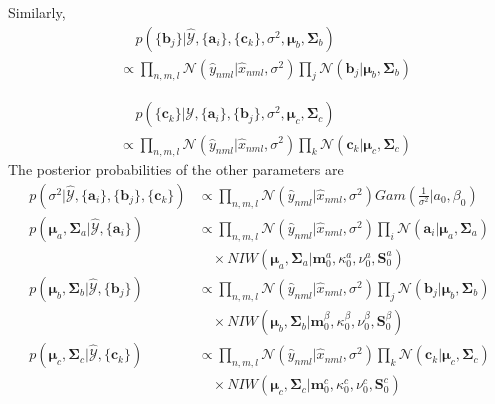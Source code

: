 \documentclass{article}
\newcommand{\bs}[1]{\boldsymbol{#1}}
\begin{document}
\begin{flushleft}
Similarly,
\begin{equation}
\begin{split}
	&\quad \, p(\{\bs{b}_j\}|\mathcal{\hat{Y}},\{\bs{a}_i\},\{\bs{c}_k\},\sigma^2,\bs{\mu}_b, \bs{\Sigma}_b)\\
	&\propto 
	\prod_{n,m,l}\mathcal{N}(\hat{y}_{nml}|\hat{x}_{nml},\sigma^2) 
		\prod_j \mathcal{N}(\bs{b}_j|\bs{\mu}_b,\bs{\Sigma}_b)
\end{split}
\end{equation}

\begin{equation}
\begin{split}
	&\quad \, p(\{\bs{c}_k\}|\mathcal{\hat{Y}},\{\bs{a}_i\},\{\bs{b}_j\},\sigma^2,\bs{\mu}_c, \bs{\Sigma}_c)\\
	&\propto 
	\prod_{n,m,l}\mathcal{N}(\hat{y}_{nml}|\hat{x}_{nml},\sigma^2) 
		\prod_k \mathcal{N}(\bs{c}_k|\bs{\mu}_c,\bs{\Sigma}_c)
\end{split}
\end{equation}
The posterior probabilities of the other parameters are
\begin{align}
	p(\sigma^2|\mathcal{\hat{Y}}, \{\bs{a}_i\}, \{\bs{b}_j\}, \{\bs{c}_k\}) 
	&\propto \prod_{n,m,l}\mathcal{N}(\hat{y}_{nml}|\hat{x}_{nml},\sigma^2)Gam(\frac{1}{\sigma^2}|a_0,\beta_0)\\
	p(\bs{\mu}_a, \bs{\Sigma}_a|\mathcal{\hat{Y}}, \{\bs{a}_i\}) 
	&\propto \prod_{n,m,l}\mathcal{N}(\hat{y}_{nml}|\hat{x}_{nml},\sigma^2) \prod_i \mathcal{N}(\bs{a}_i|\bs{\mu}_a,\bs{\Sigma}_a)\\
	& \quad \times NIW(\bs{\mu}_a, \bs{\Sigma}_a|\bs{m}^a_0,\kappa^a_0,\nu^a_0,\bs{S}^a_0)\\
	p(\bs{\mu}_b, \bs{\Sigma}_b|\mathcal{\hat{Y}}, \{\bs{b}_j\}) 
	&\propto \prod_{n,m,l}\mathcal{N}(\hat{y}_{nml}|\hat{x}_{nml},\sigma^2) \prod_j \mathcal{N}(\bs{b}_j|\bs{\mu}_b,\bs{\Sigma}_b)\\
	& \quad \times NIW(\bs{\mu}_b, \bs{\Sigma}_b|\bs{m}^\beta_0,\kappa^\beta_0,\nu^\beta_0,\bs{S}^\beta_0)\\
	p(\bs{\mu}_c, \bs{\Sigma}_c|\mathcal{\hat{Y}}, \{\bs{c}_k\}) 
	&\propto \prod_{n,m,l}\mathcal{N}(\hat{y}_{nml}|\hat{x}_{nml},\sigma^2) \prod_k \mathcal{N}(\bs{c}_k|\bs{\mu}_c,\bs{\Sigma}_c)\\
	& \quad \times NIW(\bs{\mu}_c, \bs{\Sigma}_c|\bs{m}^c_0,\kappa^c_0,\nu^c_0,\bs{S}^c_0)
\end{align}

\end{flushleft}
\end{document}
